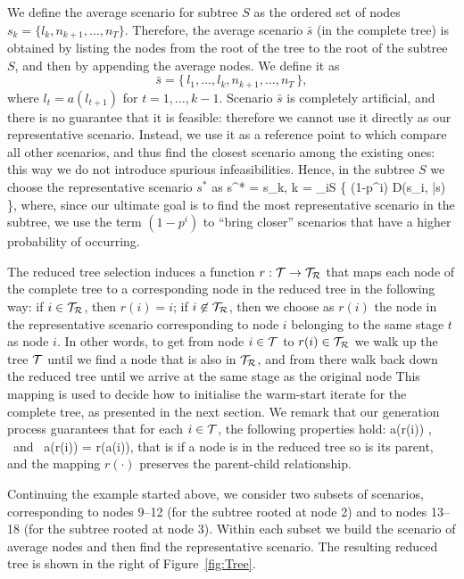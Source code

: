 We define the average scenario for subtree $S$ as the ordered
set of nodes $s_k = \{ l_k, n_{k+1}, \ldots, n_T \}$.
Therefore, the average scenario $\bar s$ (in the complete tree) 
is obtained by listing the 
nodes from the root of the tree to the root of the subtree $S$, and 
then by appending the average nodes. We define it as
\[
\bar s = \{\, l_1, \ldots, l_k, n_{k+1}, \ldots, n_T \,\},
\]
where $l_t = a(l_{t+1})$ for $t = 1,\ldots, k-1$.
Scenario $\bar{s}$ is completely artificial, and there is no guarantee 
that it is feasible: therefore we cannot use it directly as our 
representative scenario. Instead, we use it as a reference point to 
which compare all other scenarios, and thus find the closest scenario 
among the existing ones: this way we do not introduce spurious 
infeasibilities. Hence, in the subtree $S$ we choose the 
representative scenario $s^*$ as 
%
\be  \label{repScenario}
   s^* = s_k, \quad k = \arg\min_{i\in S} \{ (1-p^i) D(s_i, \bar{s}) \},
\ee
%
where, since our ultimate goal is to find the most representative scenario in 
the subtree, we use the term $(1-p^i)$ to ``bring closer'' scenarios 
that have a higher probability of occurring.

The reduced tree selection induces a function $r: \mathcal{T} \to \mathcal{T}_\mathcal{R}$ 
that maps each node of the complete tree to a corresponding node 
in the reduced tree in the following way: if $i \in \mathcal{T}_\mathcal{R}$, then
$r(i) = i$; if $i\not\in \mathcal{T}_\mathcal{R}$, then we choose as $r(i)$ the node in 
the representative scenario corresponding to node $i$ belonging to the
same stage $t$ as node $i$. In other words, to get from node
$i\in\mathcal{T}$ to $r(i)\in\mathcal{T}_\mathcal{R}$ we walk up the tree $\mathcal{T}$ until we
find a node that is also in $\mathcal{T}_\mathcal{R}$, and from there walk back down
the reduced tree until we arrive at the same stage as the original node
This mapping is used to decide how to initialise 
the warm-start iterate for the complete tree, as presented in the
next section. We remark that our generation process guarantees
that for each $i \in \mathcal{T}$, the following properties hold:
\be  \label{eq:ReducedTreeProperties}
  a(r(i)) \in \Rtree, \quad \mbox{ and } \quad a(r(i)) = r(a(i)),
\ee
that is if a node is in the reduced tree so is its parent, and the
mapping $r(\cdot)$ preserves the parent-child relationship. 

Continuing the example started above, we consider two subsets of 
scenarios, corresponding to nodes 9--12 (for the subtree rooted at 
node 2) and to nodes 13--18 (for the subtree rooted at node 3). Within 
each subset we build the scenario of average nodes and then find the 
representative scenario.
The resulting reduced tree is shown in the right of Figure~\ref{fig:Tree}.

